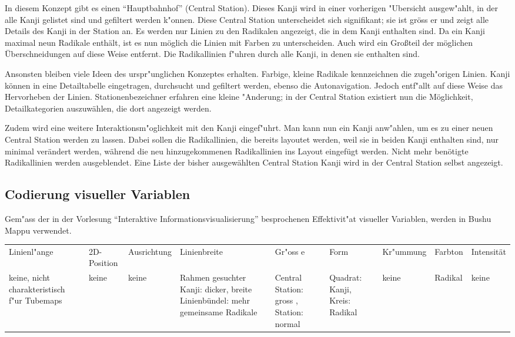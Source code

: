 In diesem Konzept gibt es einen "`Hauptbahnhof"' (Central Station). Dieses Kanji wird in einer vorherigen "Ubersicht ausgew"ahlt, in der alle Kanji gelistet sind und gefiltert werden k"onnen. Diese Central Station unterscheidet sich signifikant; sie ist gröss er und zeigt alle Details des Kanji in der Station an. Es werden nur Linien zu den Radikalen angezeigt, die in dem Kanji enthalten sind. Da ein Kanji maximal neun Radikale enthält, ist es nun möglich die Linien mit Farben zu unterscheiden. Auch wird ein Großteil der möglichen Überschneidungen auf diese Weise entfernt. Die Radikallinien f"uhren durch alle Kanji, in denen sie enthalten sind.

Ansonsten bleiben viele Ideen des urspr"unglichen Konzeptes erhalten. Farbige, kleine Radikale kennzeichnen die zugeh"origen Linien. Kanji können in eine Detailtabelle eingetragen, durchsucht und gefiltert werden, ebenso die Autonavigation. Jedoch entf"allt auf diese Weise das Hervorheben der Linien. Stationenbezeichner erfahren eine kleine "Anderung; in der Central Station existiert nun die Möglichkeit, Detailkategorien auszuwählen, die dort angezeigt werden. 

Zudem wird eine weitere Interaktionsm"oglichkeit mit den Kanji eingef"uhrt. Man kann nun ein Kanji anw"ahlen, um es zu einer neuen Central Station werden zu lassen. Dabei sollen die Radikallinien, die bereits layoutet werden, weil sie in beiden Kanji enthalten sind, nur minimal verändert werden, während die neu hinzugekommenen Radikallinien ins Layout eingefügt werden. Nicht mehr benötigte Radikallinien werden ausgeblendet. Eine Liste der bisher ausgewählten Central Station Kanji wird in der Central Station selbst angezeigt.

\subsection{Codierung visueller Variablen}
Gem"ass  der in der Vorlesung "`Interaktive Informationsvisualisierung"' besprochenen Effektivit"at visueller Variablen, werden in Bushu Mappu verwendet. 

\begin{table}[h]
\begin{tabular}{lllllllll}

Linienl"ange                                & 2D-Position & Ausrichtung & Linienbreite                                                                  & Gr"oss e                                  & Form                           & Kr"ummung & Farbton & Intensität \\
keine, nicht charakteristisch f"ur Tubemaps & keine       & keine       & Rahmen gesuchter Kanji: dicker, breite Linienbündel: mehr gemeinsame Radikale & Central Station: gross , Station: normal & Quadrat: Kanji, Kreis: Radikal & keine    & Radikal & keine      \\
\end{tabular}
\end{table}

